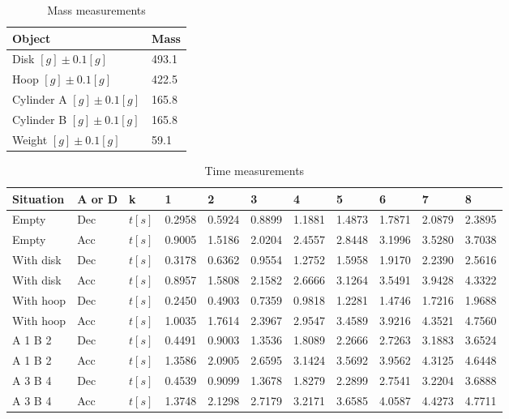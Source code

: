 \begin{table}[H]
  \centering
  \begin{tabularx}{\textwidth}{|X|X|}
    \hline
    Object & Mass\\
	\hline
    Disk $[g] \pm 0.1 [g] $ & 493.1\\
    Hoop $[g] \pm 0.1 [g] $ & 422.5\\
    Cylinder A $[g] \pm 0.1 [g] $ & 165.8\\
    Cylinder B $[g] \pm 0.1 [g] $ & 165.8\\
    Weight $[g] \pm 0.1 [g] $ & 59.1 \\
    \hline
  \end{tabularx}
  \caption{Mass measurements}
  \end{table}
\begin{table}[H]
  \centering
\begin{tabular}{|p{2cm}|p{1.5cm}|l|l|l|l|l|l|l|l|l|}
\hline
Situation & A or D & k & 1 & 2 & 3 & 4 & 5 & 6 & 7 & 8 \\
\hline
Empty & Dec & $t[s]$ & 0.2958 & 0.5924 & 0.8899 & 1.1881 & 1.4873 & 1.7871 & 2.0879 & 2.3895 \\
Empty & Acc & $t[s]$ & 0.9005 & 1.5186 & 2.0204 & 2.4557 & 2.8448 & 3.1996 & 3.5280 & 3.7038 \\
With disk & Dec &  $t[s]$ & 0.3178 & 0.6362 & 0.9554 & 1.2752 & 1.5958 & 1.9170 & 2.2390 & 2.5616 \\
With disk & Acc &  $t[s]$ & 0.8957 & 1.5808 & 2.1582 & 2.6666 & 3.1264 & 3.5491 & 3.9428 & 4.3322 \\
With hoop & Dec &  $t[s]$ & 0.2450 & 0.4903 & 0.7359 & 0.9818 & 1.2281 & 1.4746 & 1.7216 & 1.9688 \\
With hoop & Acc &  $t[s]$ & 1.0035 & 1.7614 & 2.3967 & 2.9547 & 3.4589 & 3.9216 & 4.3521 & 4.7560 \\
A 1 B 2 & Dec &  $t[s]$ & 0.4491 & 0.9003 & 1.3536 & 1.8089 & 2.2666 & 2.7263 & 3.1883 & 3.6524 \\
A 1 B 2 & Acc &  $t[s]$ & 1.3586 & 2.0905 & 2.6595 & 3.1424 & 3.5692 & 3.9562 & 4.3125 & 4.6448 \\
A 3 B 4 & Dec &  $t[s]$ & 0.4539 & 0.9099 & 1.3678 & 1.8279 & 2.2899 & 2.7541 & 3.2204 & 3.6888 \\
A 3 B 4 & Acc &  $t[s]$ & 1.3748 & 2.1298 & 2.7179 & 3.2171 & 3.6585 & 4.0587 & 4.4273 & 4.7711 \\
\hline
\end{tabular}
\caption{ Time measurements}
\end{table}
